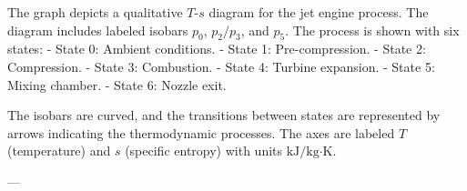 The graph depicts a qualitative \( T \)-\( s \) diagram for the jet engine process. The diagram includes labeled isobars \( p_0 \), \( p_2/p_3 \), and \( p_5 \). The process is shown with six states:  
- State 0: Ambient conditions.  
- State 1: Pre-compression.  
- State 2: Compression.  
- State 3: Combustion.  
- State 4: Turbine expansion.  
- State 5: Mixing chamber.  
- State 6: Nozzle exit.  

The isobars are curved, and the transitions between states are represented by arrows indicating the thermodynamic processes. The axes are labeled \( T \) (temperature) and \( s \) (specific entropy) with units \( \text{kJ}/\text{kg·K} \).  

---